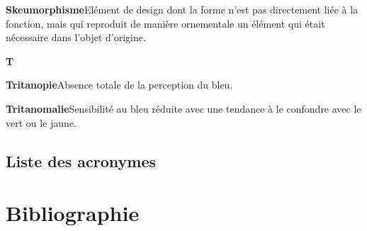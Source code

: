 \documentclass[a4paper,12pt]{article}
\begin{document}
\begin{multicols}{2}
\textbf{\hypertarget{gls-35}{Skeumorphisme}}\hspace*{1em}Elément de design dont la forme n'est pas directement liée à la fonction, mais qui reproduit de manière ornementale un élément qui était nécessaire dans l'objet d'origine.\hspace*{.5em}\pageref{gls-21-use-1}

\textbf{T}

\textbf{\hypertarget{gls-42}{Tritanopie}}\hspace*{1em}Absence totale de la perception du bleu.\hspace*{.5em}\pageref{gls-17-use-1}

\textbf{\hypertarget{gls-41}{Tritanomalie}}\hspace*{1em}Sensibilité au bleu réduite avec une tendance à le confondre avec le vert ou le jaune.\hspace*{.5em}\pageref{gls-18-use-1}
\subsection{Liste des acronymes}
\label{sec:orgae0fd8d}
\section{Bibliographie}
\label{sec:orgdf6341e}
\printbibliography[heading=none]

\end{multicols}
\end{document}
